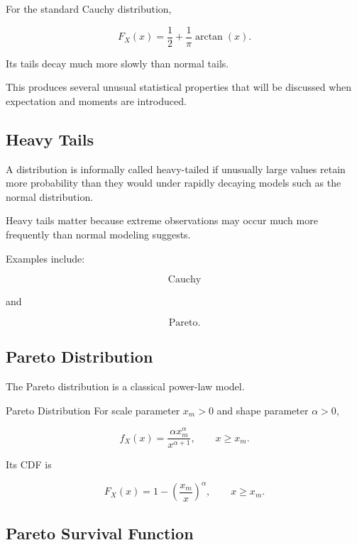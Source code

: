 For the standard Cauchy distribution,

\[
\boxed{
F_X(x)
=
\frac12
+
\frac1\pi
\arctan(x).
}
\]

Its tails decay much more slowly than normal tails.

This produces several unusual statistical properties that will be
discussed when expectation and moments are introduced.

\subsection{Heavy Tails}
\label{subsec:heavy-tails}

A distribution is informally called heavy-tailed if unusually large
values retain more probability than they would under rapidly decaying
models such as the normal distribution.

Heavy tails matter because extreme observations may occur much more
frequently than normal modeling suggests.

Examples include:

\[
\boxed{
\text{Cauchy}
}
\]

and

\[
\boxed{
\text{Pareto}.
}
\]

\subsection{Pareto Distribution}
\label{subsec:pareto-distribution}

The Pareto distribution is a classical power-law model.

\begin{definitionbox}{Pareto Distribution}
For scale parameter \(x_m>0\) and shape parameter \(\alpha>0\),

\[
\boxed{
f_X(x)
=
\frac{
\alpha x_m^\alpha
}{
x^{\alpha+1}
},
\qquad
x\geq x_m.
}
\]
\end{definitionbox}

Its CDF is

\[
\boxed{
F_X(x)
=
1-
\left(
\frac{x_m}{x}
\right)^\alpha,
\qquad
x\geq x_m.
}
\]

\subsection{Pareto Survival Function}
\label{subsec:pareto-survival}

